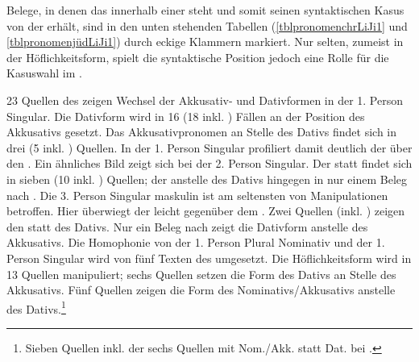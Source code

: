 Belege, in denen das  innerhalb einer  steht und somit seinen syntaktischen Kasus von der  erhält, sind in den unten stehenden Tabellen (\ref{tblpronomenchrLiJi1} und \ref{tblpronomenjüdLiJi1}) 
durch eckige Klammern markiert. Nur selten, zumeist in der Höflichkeitsform, spielt die syntaktische Position jedoch eine Rolle für die Kasuswahl im .

 23 Quellen des  zeigen Wechsel der Akkusativ- und Dativformen in der 1. Person Singular. Die Dativform wird in 16 (18 inkl. ) Fällen an der Position des Akkusativs gesetzt. Das Akkusativpronomen an Stelle des Dativs findet sich in drei (5 inkl. ) Quellen. In der 1. Person Singular profiliert damit deutlich der  über den . 
 Ein ähnliches Bild zeigt sich bei der 2. Person Singular. Der  statt  findet sich in sieben (10 inkl. ) Quellen; der  anstelle des Dativs hingegen in nur einem Beleg nach .
 Die 3. Person Singular maskulin ist am seltensten von Manipulationen betroffen. Hier überwiegt der  leicht gegenüber dem . Zwei Quellen (inkl. ) zeigen den  statt des Dativs. Nur ein Beleg nach  zeigt die Dativform anstelle des Akkusativs. 
 Die Homophonie von der 1. Person Plural Nominativ und der 1. Person Singular  wird von fünf Texten des  umgesetzt.
 Die Höflichkeitsform wird in 13 Quellen manipuliert; sechs Quellen setzen die Form des Dativs an Stelle des Akkusativs. Fünf Quellen zeigen die Form des Nominativs/Akkusativs anstelle des Dativs.\footnote{Sieben Quellen inkl. der sechs Quellen mit Nom./Akk. statt Dat. bei .}\\ 
